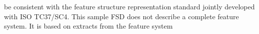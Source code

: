 \begin{shaded}
\hspace*{1em}\hspace*{1em}\hspace*{1em}\hspace*{1em}\hspace*{1em}\hspace*{1em}\hspace*{1em}\hspace*{1em} be consistent with the feature structure representation standard\mbox{}\newline 
\hspace*{1em}\hspace*{1em}\hspace*{1em}\hspace*{1em}\hspace*{1em}\hspace*{1em}\hspace*{1em}\hspace*{1em} jointly developed with ISO TC37/SC4.\mbox{}\newline 
\hspace*{1em}\hspace*{1em}\hspace*{1em}\mbox{}\newline 
\hspace*{1em}\hspace*{1em}\mbox{}\newline 
\hspace*{1em}\hspace*{1em}\mbox{}\newline 
\hspace*{1em}\hspace*{1em}\hspace*{1em}This sample FSD does not describe a complete feature\mbox{}\newline 
\hspace*{1em}\hspace*{1em}\hspace*{1em}\hspace*{1em}\hspace*{1em}\hspace*{1em}\hspace*{1em}\hspace*{1em} system. It is based on extracts from the feature system\mbox{}\newline 

\end{shaded}
